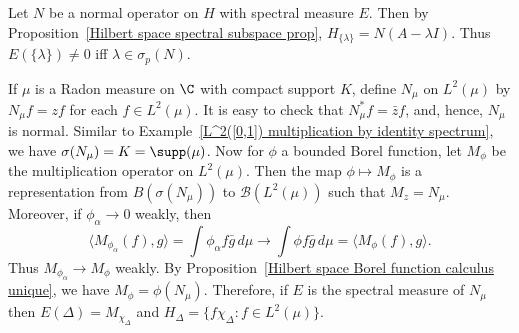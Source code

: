 \begin{example}\label{Hilbert space normal operator eigenvalue iff spectral measure}
Let $N$ be a normal operator on $H$ with spectral measure $E$. Then by Proposition~\ref{Hilbert space spectral subspace prop}, $H_{\{\lambda\}}=N(A-\lambda I)$. Thus $E(\{\lambda\})\neq 0$ iff $\lambda\in\sigma_p(N)$. 
\end{example}
\begin{example}\label{spectral measure for multiplication by identity}
If $\mu$ is a Radon measure on $\C$ with compact support $K$, define $N_\mu$ on $L^2(\mu)$ by $N_\mu f=zf$ for each $f\in L^2(\mu)$. It is easy to check that $N_\mu^*f=\bar{z}f$, and, hence, $N_\mu$ is normal. Similar to Example~\ref{L^2([0,1]) multiplication by identity spectrum}, we have $\sigma(N_\mu)=K=\supp(\mu)$. Now for $\phi$ a bounded Borel function, let $M_\phi$ be the multiplication operator on $L^2(\mu)$. Then the map $\phi\mapsto M_\phi$ is a representation from $B(\sigma(N_\mu))$ to $\mathcal{B}(L^2(\mu))$ such that $M_z=N_\mu$. Moreover, if $\phi_\alpha\to 0$ weakly, then
\[\langle M_{\phi_\alpha}(f),g\rangle=\int\phi_\alpha f\bar{g}\,d\mu\to\int\phi f\bar{g}\,d\mu=\langle M_\phi(f),g\rangle.\]
Thus $M_{\phi_\alpha}\to M_\phi$ weakly. By Proposition~\ref{Hilbert space Borel function calculus unique}, we have $M_\phi=\phi(N_\mu)$. Therefore, if $E$ is the spectral measure of $N_\mu$ then $E(\Delta)=M_{\chi_\Delta}$ and $H_\Delta=\{f\chi_\Delta:f\in L^2(\mu)\}$.
\end{example}
